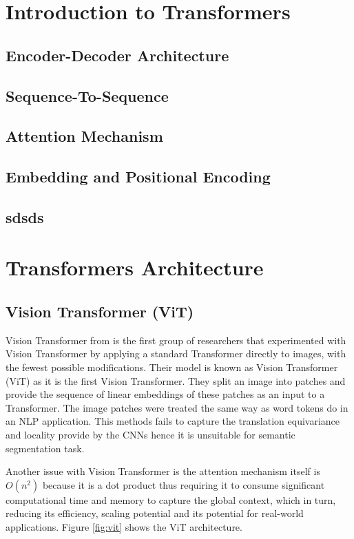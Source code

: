 \section{Introduction to Transformers}\label{subsection:Intro to Trans}
\subsection{Encoder-Decoder Architecture}
\subsection{Sequence-To-Sequence}
\subsection{Attention Mechanism}
\subsection{Embedding and Positional Encoding}
\subsection{sdsds}\label{sasas}
\section{Transformers Architecture}
\subsection{Vision Transformer (ViT)}
Vision Transformer from \cite{16x16} is the first group of researchers that experimented with Vision Transformer by applying a standard Transformer directly to images, with the fewest possible modifications. Their model is known as Vision Transformer (ViT) as it is the first Vision Transformer. They split an image into patches and provide the sequence of linear embeddings of these patches as an input to a Transformer. The image patches were treated the same way as word tokens do in an NLP application. This methods fails to capture the  translation equivariance and locality provide by the CNNs hence it is unsuitable for semantic segmentation task.

Another issue with Vision Transformer is the attention mechanism itself is $O(n^2)$ because it is a dot product thus requiring it to consume significant computational time and memory to capture the global context, which in turn, reducing its efficiency, scaling potential and its potential for real-world applications. Figure \ref{fig:vit} shows the ViT architecture.


